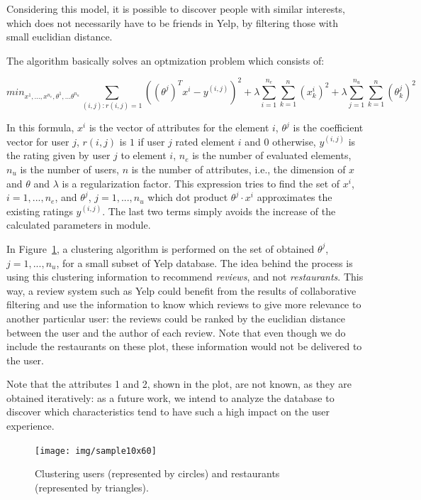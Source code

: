 \documentclass[12pt]{article}
\begin{document}
Considering this model, it is possible to
discover people with similar interests, which does not necessarily have to be friends in Yelp,
by filtering those with small euclidian distance.

The algorithm basically solves an optmization problem which consists of:

\[
min_{x^1,...,x^{n_e},\theta^1,...\theta^{n_u}}
  \sum_{(i,j):r(i,j)=1} ((\theta^j)^T x^i - y^{(i,j)})^2 +
  \lambda \sum_{i=1}^{n_e} \sum_{k=1}^{n} (x_k^i)^2 +
  \lambda \sum_{j=1}^{n_u} \sum_{k=1}^{n} (\theta_k^j)^2
\]

In this formula, $x^i$ is the vector of attributes for the element $i$,
$\theta^j$ is the coefficient vector for user $j$, $r(i,j)$ is $1$ if user $j$
rated element $i$ and $0$ otherwise, $y^{(i,j)}$ is the rating given by user $j$
to element $i$, $n_e$ is the number of evaluated elements, $n_u$ is the number
of users, $n$ is the number of attributes, i.e., the dimension of $x$ and
$\theta$ and $\lambda$ is a regularization factor. This expression tries to find
the set of $x^i$, $i=1,...,n_e$, and $\theta^j$, $j=1,...,n_u$ which dot product
$\theta^j \cdot x^i$ approximates the existing ratings $y^{(i,j)}$. The last two
terms simply avoids the increase of the calculated parameters in module.

In Figure~\ref{fig:clusters}, a clustering algorithm is performed on the set of obtained
$\theta^j$, $j=1,...,n_u$, for a small subset of Yelp database. The idea behind the process is using this clustering information to recommend \textit{reviews}, and not \textit{restaurants}. This way, a review system such as Yelp could benefit from the results of collaborative filtering and use the information to know which reviews to give more relevance to another particular user: the reviews could be ranked by the euclidian distance between the user and the author of each review. Note that even though we do include the restaurants on these plot, these information would not be delivered to the user.

Note that the attributes 1 and 2, shown in the plot, are not known, as they are obtained iteratively: as a future work, we intend to analyze the database to discover which characteristics tend to have such a high impact on the user experience.

\begin{figure}[ht]
\centering
\texttt{[image: img/sample10x60]}
\caption{Clustering users (represented by circles) and restaurants (represented by triangles).}
\label{fig:clusters}
\end{figure}
\end{document}

